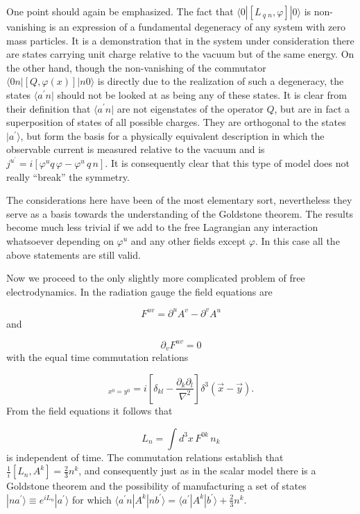 \documentclass[%
  12pt,
  paper=letter,
  abstracton,
  pagesize=auto,
  version=last,
  DIV=calc
  ]{scrartcl}
\begin{document}
One point should again be emphasized.  The fact that $\langle 0 | [L\,_q\,_n,
\varphi] | 0\rangle$ is non-vanishing is an expression of a fundamental
degeneracy of any system with zero mass particles.  It is a
demonstration that in the system under consideration there are states
carrying unit charge relative to the vacuum but of the same energy.
On the other hand, though the non-vanishing of the commutator $\langle
0 n | [Q, \varphi (x)] | n 0\rangle$ is directly due to the realization of such a
degeneracy, the states $\langle a^{\prime} n|$ should not be looked at as being
any of these states.  It is clear from their definition that
$\langle a^{\prime} n |$ are not eigenstates of the operator $Q$, but are in
fact a superposition of states of all possible charges.  They are
orthogonal to the states $|a^{\prime}\rangle$, but form the basis for a
physically equivalent description in which the observable current is
measured relative to the vacuum and is $j^{u^{\prime}} = i[\varphi^u
q\, \varphi - \varphi^u\, q\, n]$.  It is consequently clear that this type
of model does not really ``break'' the symmetry.

The considerations here have been of the most elementary sort,
nevertheless they serve as a basis towards the understanding of the
Goldstone theorem.  The results become much less trivial if we add to
the free Lagrangian any interaction whatsoever depending on
$\varphi^u$ and any other fields except $\varphi$.  In this case all
the above statements are still valid.

Now we proceed to the only slightly more complicated problem of free
electrodynamics.  In the radiation gauge the field equations are

\begin{equation*}
F^{u v} = \partial^u A^v - \partial^v A^u
\end{equation*}
and

\begin{equation*}
\partial_v F^{u v} = 0
\end{equation*}
with the equal time commutation relations

\begin{equation*}
[F^{0 k} (x), A^l (y)]_{x^{0} = y^{0}} = i [ \delta_{k l} - \frac{\partial_k \partial_l}{\nabla^2}] \delta^3 (\vec x - \vec y).
\end{equation*}
From the field equations it follows that

\begin{equation*}
L_n = \int d^3x\, F^{0k}\, n_k
\end{equation*}
is independent of time.  The commutation relations establish that
$\frac{1}{i} [L_n, A^k]=\frac{2}{3} n^k$, and consequently just as in
the scalar model there is a Goldstone theorem and the possibility of
manufacturing a set of states $| n a^{\prime}\rangle \equiv e^{iL_n} |
a^{\prime}\rangle$ for which $\langle a^{\prime} n | A^k | n b^{\prime}\rangle =
\langle a^{\prime} | A^k | b^{\prime}\rangle + \frac{2}{3} n^k$.
\end{document}
